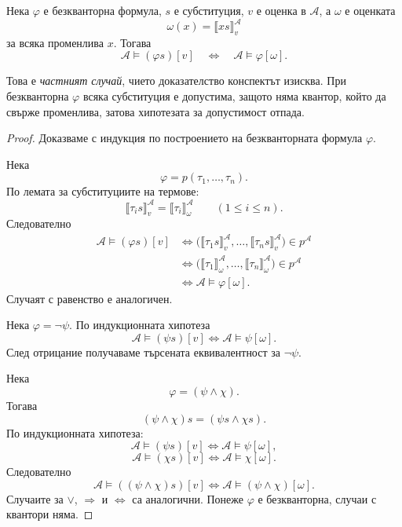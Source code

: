 \begin{keythm}
Нека $\varphi$ е безкванторна формула, $s$ е субституция, $v$ е оценка в $\mathcal A$, а $\omega$ е оценката
\[
\omega(x)=\llbracket xs\rrbracket^{\mathcal A}_v
\]
за всяка променлива $x$. Тогава
\[
\mathcal A\models(\varphi s)[v]
\quad\Longleftrightarrow\quad
\mathcal A\models\varphi[\omega].
\]
\end{keythm}

Това е \emph{частният случай}, чието доказателство конспектът изисква. При
безкванторна $\varphi$ всяка субституция е допустима, защото няма квантор, който
да свърже променлива, затова хипотезата за допустимост отпада.

\begin{proof}
Доказваме с индукция по построението на безкванторната формула $\varphi$.

Нека
\[
\varphi=p(\tau_1,\ldots,\tau_n).
\]
По лемата за субституциите на термове:
\[
\llbracket\tau_i s\rrbracket^{\mathcal A}_v
=
\llbracket\tau_i\rrbracket^{\mathcal A}_\omega
\qquad (1\leq i\leq n).
\]
Следователно
\[
\begin{aligned}
\mathcal A\models(\varphi s)[v]
&\Longleftrightarrow
\bigl(
\llbracket\tau_1s\rrbracket^{\mathcal A}_v,\ldots,
\llbracket\tau_ns\rrbracket^{\mathcal A}_v
\bigr)\in p^{\mathcal A}\\
&\Longleftrightarrow
\bigl(
\llbracket\tau_1\rrbracket^{\mathcal A}_\omega,\ldots,
\llbracket\tau_n\rrbracket^{\mathcal A}_\omega
\bigr)\in p^{\mathcal A}\\
&\Longleftrightarrow
\mathcal A\models\varphi[\omega].
\end{aligned}
\]
Случаят с равенство е аналогичен.

Нека $\varphi=\neg\psi$. По индукционната хипотеза
\[
\mathcal A\models(\psi s)[v]
\Longleftrightarrow
\mathcal A\models\psi[\omega].
\]
След отрицание получаваме търсената еквивалентност за $\neg\psi$.

Нека
\[
\varphi=(\psi\wedge\chi).
\]
Тогава
\[
(\psi\wedge\chi)s=(\psi s\wedge\chi s).
\]
По индукционната хипотеза:
\[
\mathcal A\models(\psi s)[v]\Longleftrightarrow\mathcal A\models\psi[\omega],
\]
\[
\mathcal A\models(\chi s)[v]\Longleftrightarrow\mathcal A\models\chi[\omega].
\]
Следователно
\[
\mathcal A\models((\psi\wedge\chi)s)[v]
\Longleftrightarrow
\mathcal A\models(\psi\wedge\chi)[\omega].
\]
Случаите за $\vee$, $\Rightarrow$ и $\Leftrightarrow$ са аналогични. Понеже $\varphi$ е безкванторна, случаи с квантори няма.
\end{proof}

